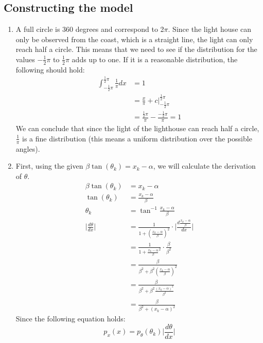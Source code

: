 \documentclass[a4paper,10pt]{article}
\numberwithin{equation}{section} %
\numberwithin{figure}{section} %
\numberwithin{table}{section} %
\theoremstyle{mytheor}
\begin{document}
\subsection{Constructing the model}
\begin{enumerate}
	\item A full circle is 360 degrees and correspond to 2$\pi$. Since the light house can only be observed from the coast, which is a straight line, the light can only reach half a circle. This means that we need to see if the distribution for the values $-\frac{1}{2}\pi$ to $\frac{1}{2}\pi$ adds up to one. If it is a reasonable distribution, the following should hold:
		\begin{align}
		\int_{-\frac{1}{2}\pi}^{\frac{1}{2}\pi} \frac{1}{\pi} dx &= 1\\
		&= \frac{x}{\pi} + c \bigg \vert_{-\frac{1}{2}\pi}^{\frac{1}{2}\pi}\\
		& = \frac{\frac{1}{2}\pi}{\pi} - \frac{-\frac{1}{2}\pi}{\pi} = 1
		\end{align}
		We can conclude that since the light of the lighthouse can reach half a circle, $\frac{1}{\pi}$ is a fine distribution (this means a uniform distribution over the possible angles).
	\item First, using the given $\beta \tan (\theta_k) = x_k - \alpha$, we will calculate the derivation of $\theta$.
		\begin{align}
		\beta \tan (\theta_k) &= x_k - \alpha \tag{Assignment eq. 7}\\
		\tan (\theta_k) &= \frac{x_k - \alpha}{\beta} \\
		\theta_k &= \tan^{-1} \frac{x_k - \alpha}{\beta} \\
		\bigg \vert \frac{d\theta}{dx} \bigg \vert &= \frac{1}{1 + (\frac{x_k - \alpha}{\beta})^2} \cdot \bigg \vert \frac{d\frac{x_k - \alpha}{\beta}}{dx} \bigg \vert\\
		&= \frac{1}{1 + \frac{x_k - \alpha}{\beta}^2} \cdot \frac{\beta}{\beta^2}\\
		&= \frac{\beta}{\beta^2 + \beta^2(\frac{x_k - \alpha}{\beta})^2}\\
		&= \frac{\beta}{\beta^2 + \beta^2\frac{(x_k - \alpha)^2}{\beta^2}}\\
		& = \frac{\beta}{\beta^2 + (x_k - \alpha)^2}
		\end{align}
		Since the following equation holds:
		\begin{equation}
		p_x(x) = p_{\theta}(\theta_k)\bigg \vert \frac{d\theta}{dx} \bigg \vert \tag{Bishop 1.27}
		\end{equation}

\end{enumerate}
\end{document}
